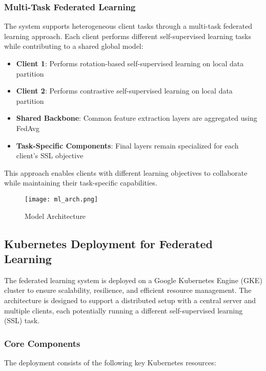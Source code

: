 \documentclass[a4paper, 10 pt, conference]{ieeeconf}
\begin{document}
\subsubsection{Multi-Task Federated Learning}

The system supports heterogeneous client tasks through a multi-task federated learning approach. Each client performs different self-supervised learning tasks while contributing to a shared global model:

\begin{itemize}
    \item \textbf{Client 1}: Performs rotation-based self-supervised learning on local data partition
    \item \textbf{Client 2}: Performs contrastive self-supervised learning on local data partition
    \item \textbf{Shared Backbone}: Common feature extraction layers are aggregated using FedAvg
    \item \textbf{Task-Specific Components}: Final layers remain specialized for each client's SSL objective
\end{itemize}

This approach enables clients with different learning objectives to collaborate while maintaining their task-specific capabilities.

\begin{figure*}[!htbp]
\centering
\texttt{[image: ml\_arch.png]}
\caption{Model Architecture}
\label{fig:ML_arch}
\end{figure*}

\subsection{Kubernetes Deployment for Federated Learning}

The federated learning system is deployed on a Google Kubernetes Engine (GKE) cluster to ensure scalability, resilience, and efficient resource management. The architecture is designed to support a distributed setup with a central server and multiple clients, each potentially running a different self-supervised learning (SSL) task.

\subsubsection{Core Components}
The deployment consists of the following key Kubernetes resources:
\end{document}
